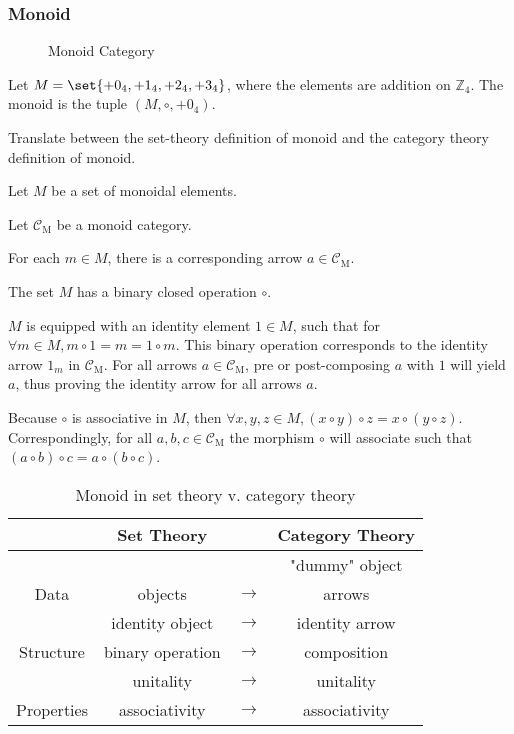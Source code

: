 \subsubsection{Monoid}
\begin{figure}[H]
	\begin{center}
		
	\end{center}
	\caption{Monoid Category}
\end{figure}
Let $M=\set{+0_4, +1_4, +2_4, +3_4}$, where the elements are addition on
$\mathbb{Z}_4$. The monoid is the tuple $(M, \circ, +0_4)$.
\begin{ttta}
	Translate between the set-theory definition of monoid and the category theory
	definition of monoid.
\end{ttta}
\begin{proofitem}
	\item Let $M$ be a set of monoidal elements.
	\item Let $\mathcal{C}_\text{M}$ be a monoid category.
	\item For each $m\in M$, there is a corresponding arrow $a\in
		\mathcal{C}_\text{M}$.
	\item The set $M$ has a binary closed operation $\circ$.
	\item $M$ is equipped with an identity element $1\in M$, such that for
	$\forall m \in M, m\circ 1 = m = 1 \circ m$. This binary operation
	corresponds to the identity arrow $1_m$ in $\mathcal{C}_\text{M}$. For
	all arrows $a\in\mathcal{C}_\text{M}$, pre or post-composing $a$ with
	$1$ will yield $a$, thus proving the identity arrow for all arrows $a$.
	\item Because $\circ$ is associative in $M$, then $\forall x, y, z \in M,
		(x\circ y)\circ z = x\circ(y\circ z)$. Correspondingly, for all $a, b, c\in
		\mathcal{C}_\text{M}$ the morphism $\circ$ will associate such that
	$(a\circ b)\circ c= a\circ(b\circ c)$.
\end{proofitem}
\begin{table}
	\centering
	\begin{tabular}{ c|ccc }
		\hline
		           & Set Theory       &               & Category Theory \\ \hline
		           &                  &               & "dummy" object  \\
		Data       & objects          & $\rightarrow$ & arrows          \\ \hline
		           & identity object  & $\rightarrow$ & identity arrow  \\
		Structure  & binary operation & $\rightarrow$ & composition     \\ \hline
		           & unitality        & $\rightarrow$ & unitality       \\
		Properties & associativity    & $\rightarrow$ & associativity
		\\\hline
	\end{tabular}
	\caption{Monoid in set theory v. category theory}
\end{table}
